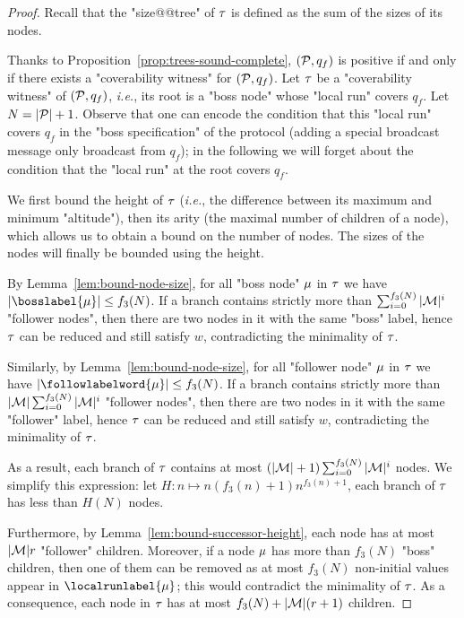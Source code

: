 \begin{proof}
	Recall that the "size@@tree" of $\tau$ is defined as the sum of the sizes of its nodes. 

	Thanks to Proposition~\ref{prop:trees-sound-complete}, $(\mathcal{P},q_f)$ is positive if and only if there exists a "coverability witness" for $(\mathcal{P},q_f)$.
	Let $\tau$ be a "coverability witness" of $(\mathcal{P},q_f)$, \emph{i.e.}, its root is a "boss node" whose "local run" covers $q_f$. Let $N = |\mathcal{P}|+1$. Observe that one can encode the condition that this "local run" covers $q_f$ in the "boss specification" of the protocol (adding a special broadcast message only broadcast from $q_f$); in the following we will forget about the condition that the "local run" at the root covers $q_f$.
	
	We first bound the height of $\tau$ (\emph{i.e.}, the difference between its maximum and minimum "altitude"), then its arity (the maximal number of children of a node), which allows us to obtain a bound on the number of nodes. The sizes of the nodes will finally be bounded using the height. 
	
	By Lemma~\ref{lem:bound-node-size}, for all "boss node" $\mu$ in $\tau$ we have $\size{\bosslabel{\node}} \leq f_3(N)$.
	If a branch contains strictly more than $\sum_{i=0}^{f_3(N)}|\mathcal{M}|^{i}$ "follower nodes", then there are two nodes in it with the same "boss" label, hence $\tau$ can be reduced and still satisfy $w$, contradicting the minimality of $\tau$.

	Similarly, by Lemma~\ref{lem:bound-node-size}, for all "follower node" $\mu$ in $\tau$ we have $\size{\followlabelword{\node}} \leq f_3(N)$.
	If a branch contains strictly more than $|\mathcal{M}| \sum_{i=0}^{f_3(N)}|\mathcal{M}|^{i}$ "follower nodes", then there are two nodes in it with the same "follower" label, hence $\tau$ can be reduced and still satisfy $w$, contradicting the minimality of $\tau$.
	
	As a result, each branch of $\tau$ contains at most $(|\mathcal{M}|+1) \sum_{i=0}^{f_3(N)}|\mathcal{M}|^{i}$ nodes. We simplify this expression: let $H: n \mapsto n (f_3(n)+1) n^{f_3(n)+1}$, each branch of $\tau$ has less than $H(N)$ nodes.
	
	Furthermore, by Lemma~\ref{lem:bound-successor-height}, each node has at most $|\mathcal{M}|r$ "follower" children. Moreover, if a node $\mu$ has more than $f_3(N)$ "boss" children, then one of them can be removed as at most $f_3(N)$ non-initial values appear in $\localrunlabel{\node}$; this would contradict the minimality of $\tau$.	
	As a consequence, each node in $\tau$ has at most $f_3(N) + |\mathcal{M}|(r+1)$ children.


\end{proof}
